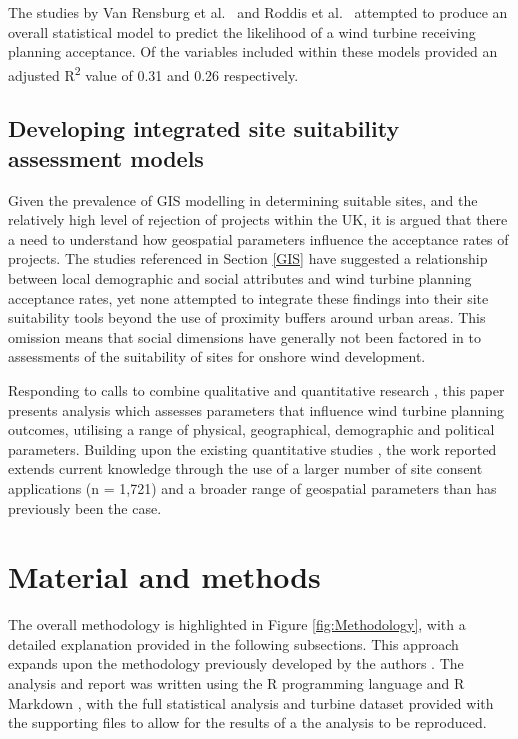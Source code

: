 \documentclass[a4paper,]{article}
\theoremstyle{definition}
\theoremstyle{definition}
\theoremstyle{definition}
\theoremstyle{remark}
\begin{document}
The studies by Van Rensburg et al.~\citeyearpar{VanRensburg20} and Roddis et al.~\citeyearpar{Roddis2018} attempted to produce an overall statistical model to predict the likelihood of a wind turbine receiving planning acceptance. Of the variables included within these models provided an adjusted R\textsuperscript{2} value of 0.31 and 0.26 respectively.

\hypertarget{developing-integrated-site-suitability-assessment-models}{%
\subsection{Developing integrated site suitability assessment models}\label{developing-integrated-site-suitability-assessment-models}}

Given the prevalence of GIS modelling in determining suitable sites, and the relatively high level of rejection of projects within the UK, it is argued that there a need to understand how geospatial parameters influence the acceptance rates of projects. The studies referenced in Section \ref{GIS} have suggested a relationship between local demographic and social attributes and wind turbine planning acceptance rates, yet none attempted to integrate these findings into their site suitability tools beyond the use of proximity buffers around urban areas. This omission means that social dimensions have generally not been factored in to assessments of the suitability of sites for onshore wind development.

Responding to calls to combine qualitative and quantitative research \citep[p.256]{Langer2016}, this paper presents analysis which assesses parameters that influence wind turbine planning outcomes, utilising a range of physical, geographical, demographic and political parameters. Building upon the existing quantitative studies \citep{Toke2005, VanderHorst2010, VanRensburg20, Roddis2018}, the work reported extends current knowledge through the use of a larger number of site consent applications (n = 1,721) and a broader range of geospatial parameters than has previously been the case.

\hypertarget{material-and-methods}{%
\section{Material and methods}\label{material-and-methods}}

The overall methodology is highlighted in Figure \ref{fig:Methodology}, with a detailed explanation provided in the following subsections. This approach expands upon the methodology previously developed by the authors \citep{Harper2017, Harper2018}. The analysis and report was written using the R programming language \citep{R-base} and R Markdown \citep{R-rmarkdown}, with the full statistical analysis and turbine dataset provided with the supporting files to allow for the results of a the analysis to be reproduced.
\end{document}
